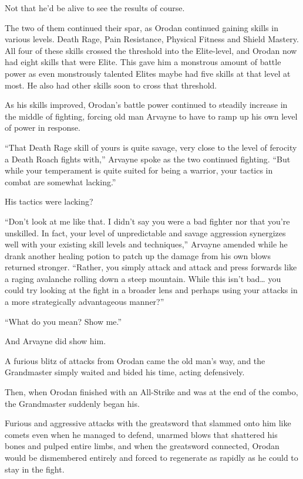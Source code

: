 \documentclass[a4paper,10pt]{book}
\begin{document}
Not that he’d be alive to see the results of course.\par
The two of them continued their spar, as Orodan continued gaining skills in various levels. Death Rage, Pain Resistance, Physical Fitness and Shield Mastery. All four of these skills crossed the threshold into the Elite-level, and Orodan now had eight skills that were Elite. This gave him a monstrous amount of battle power as even monstrously talented Elites maybe had five skills at that level at most. He also had other skills soon to cross that threshold.\par
As his skills improved, Orodan’s battle power continued to steadily increase in the middle of fighting, forcing old man Arvayne to have to ramp up his own level of power in response.\par
“That Death Rage skill of yours is quite savage, very close to the level of ferocity a Death Roach fights with,” Arvayne spoke as the two continued fighting. “But while your temperament is quite suited for being a warrior, your tactics in combat are somewhat lacking.”\par
His tactics were lacking?\par
“Don’t look at me like that. I didn’t say you were a bad fighter nor that you’re unskilled. In fact, your level of unpredictable and savage aggression synergizes well with your existing skill levels and techniques,” Arvayne amended while he drank another healing potion to patch up the damage from his own blows returned stronger. “Rather, you simply attack and attack and press forwards like a raging avalanche rolling down a steep mountain. While this isn’t bad… you could try looking at the fight in a broader lens and perhaps using your attacks in a more strategically advantageous manner?”\par
“What do you mean? Show me.”\par
And Arvayne did show him.\par
A furious blitz of attacks from Orodan came the old man’s way, and the Grandmaster simply waited and bided his time, acting defensively.\par
Then, when Orodan finished with an All-Strike and was at the end of the combo, the Grandmaster suddenly began his.\par
Furious and aggressive attacks with the greatsword that slammed onto him like comets even when he managed to defend, unarmed blows that shattered his bones and pulped entire limbs, and when the greatsword connected, Orodan would be dismembered entirely and forced to regenerate as rapidly as he could to stay in the fight.\par
\end{document}
